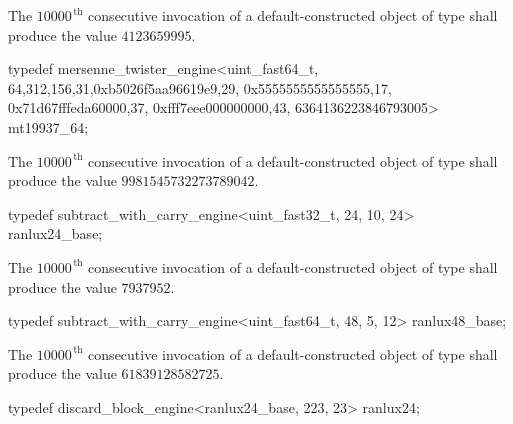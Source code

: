 \begin{itemdescr}
\pnum\required
 The $10000^{\,\mathrm{th}}$ consecutive invocation
 of a default-constructed object
 of type 
 shall produce the value $4123659995$.
\end{itemdescr}

%
%
\begin{itemdecl}
typedef mersenne_twister_engine<uint_fast64_t,
       64,312,156,31,0xb5026f5aa96619e9,29,
       0x5555555555555555,17,
       0x71d67fffeda60000,37,
       0xfff7eee000000000,43,
       6364136223846793005>
       mt19937_64;
\end{itemdecl}

\begin{itemdescr}
\pnum\required
 The $10000^{\,\mathrm{th}}$ consecutive invocation
 of a default-constructed object
 of type 
 shall produce the value $9981545732273789042$.
\end{itemdescr}

%
%
\begin{itemdecl}
typedef subtract_with_carry_engine<uint_fast32_t, 24, 10, 24>
       ranlux24_base;
\end{itemdecl}

\begin{itemdescr}
\pnum\required
 The $10000^{\,\mathrm{th}}$ consecutive invocation
 of a default-constructed object
 of type 
 shall produce the value
 $ 7937952 $.
\end{itemdescr}

%
%
\begin{itemdecl}
typedef subtract_with_carry_engine<uint_fast64_t, 48, 5, 12>
       ranlux48_base;
\end{itemdecl}

\begin{itemdescr}
\pnum\required
 The $10000^{\,\mathrm{th}}$ consecutive invocation
 of a default-constructed object
 of type 
 shall produce the value
 $ 61839128582725 $.
\end{itemdescr}

%
%
\begin{itemdecl}
typedef discard_block_engine<ranlux24_base, 223, 23>
       ranlux24;
\end{itemdecl}

